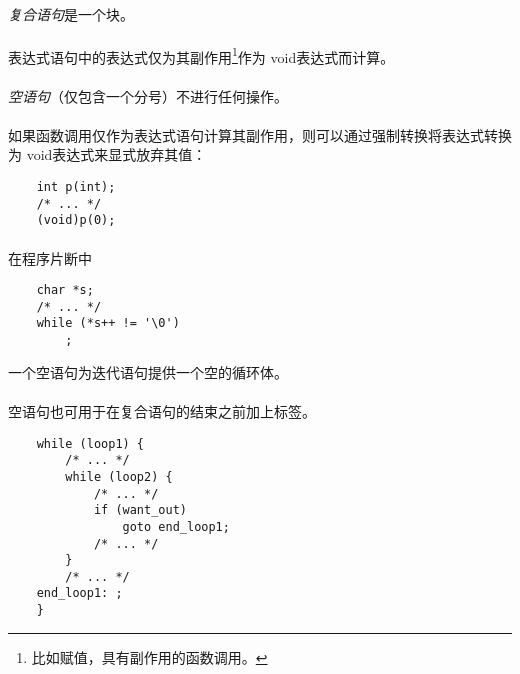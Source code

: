 \semantic
\paragraph{}
\textit{复合语句}是一个块。

\syntax
\paragraph{}

\semantic
\paragraph{}
表达式语句中的表达式仅为其副作用\footnote{比如赋值，具有副作用的函数调用。}作为
void表达式而计算。

\paragraph{}
\textit{空语句}（仅包含一个分号）不进行任何操作。

\paragraph{}
\ex 如果函数调用仅作为表达式语句计算其副作用，则可以通过强制转换将表达式转换为
void表达式来显式放弃其值：
\begin{lstlisting}
    int p(int);
    /* ... */
    (void)p(0);
\end{lstlisting}

\paragraph{}
\ex 在程序片断中
\begin{lstlisting}
    char *s;
    /* ... */
    while (*s++ != '\0')
        ;
\end{lstlisting}
一个空语句为迭代语句提供一个空的循环体。

\paragraph{}
\ex 空语句也可用于在复合语句的结束\tm{\}}之前加上标签。
\begin{lstlisting}
    while (loop1) {
        /* ... */
        while (loop2) {
            /* ... */
            if (want_out)
                goto end_loop1;
            /* ... */
        }
        /* ... */
    end_loop1: ;
    }
\end{lstlisting}

